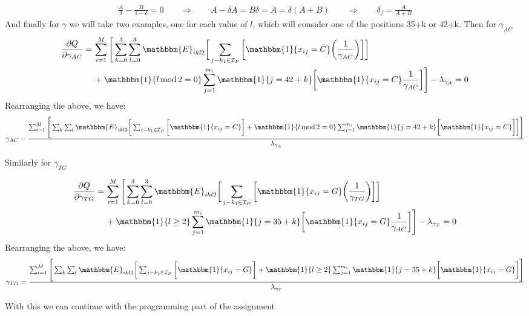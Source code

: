 \documentclass[10pt]{article}
\begin{document}
\begin{enumerate}[label = \textbf{\arabic*.}]
\begin{align}
            \frac{A}{\delta}-\frac{B}{1-\delta}=0 \qquad\Rightarrow \qquad A-\delta A=B\delta = A = \delta(A+B)\qquad \Rightarrow \qquad\delta_j=\frac{A}{A+B}
        \end{align}
        And finally for $\gamma$ we will take two examples, one for each value of $l$, which will consider one of the positions 35+k or 42+k. Then for $\gamma_{AC}$
        \begin{align}
            \frac{\partial Q}{\partial \gamma_{AC}} = \,&\sum_{i=1}^M\Bigg[\sum_{k=0}^3\sum_{l=0}^3\mathbbm{E}_{ikl2}\bigg[\sum_{j - k_1 \in \mathcal{I}_P}\bigg[\mathbbm{1}\{x_{ij}=C\}\bigg(\frac{1}{\gamma_{AC}} \bigg) \bigg] \bigg]\nonumber\nonumber\\
            &+ \mathbbm{1}\{l\,\mathrm{mod}\,2 = 0\}\sum_{j=1}^{m_i}\mathbbm{1}\{j=42+k\}\bigg[\mathbbm{1}\{x_{ij}=C\}\frac{1}{\gamma_{AC}} \bigg]\Bigg] - \lambda_{\gamma_A} = 0 \nonumber
        \end{align}
        Rearranging the above, we have:
        \begin{align}
            \gamma_{AC} = \frac{\sum_{i=1}^M\Bigg[\sum_k\sum_l\mathbbm{E}_{ikl2}\bigg[\sum_{j - k_1 \in \mathcal{I}_P}\bigg[\mathbbm{1}\{x_{ij}=C\}\bigg] + \mathbbm{1}\{l\,\mathrm{mod}\,2 = 0\}\sum_{j=1}^{m_i}\mathbbm{1}\{j=42+k\}\bigg[\mathbbm{1}\{x_{ij}=C\} \bigg]\bigg]\Bigg]}{\lambda_{\gamma_A}}
        \end{align}
       
       Similarly for $\gamma_{TG}$
        
        \begin{align}
            \frac{\partial Q}{\partial \gamma_{TG}} = \,&\sum_{i=1}^M\Bigg[\sum_{k=0}^3\sum_{l=0}^3\mathbbm{E}_{ikl2}\bigg[\sum_{j - k_1 \in \mathcal{I}_P}\bigg[\mathbbm{1}\{x_{ij}=G\}\bigg(\frac{1}{\gamma_{TG}} \bigg) \bigg] \bigg]\nonumber\nonumber\\
            &+ \mathbbm{1}\{l\geq2\}\sum_{j=1}^{m_i}\mathbbm{1}\{j=35+k\}\bigg[\mathbbm{1}\{x_{ij}=G\}\frac{1}{\gamma_{AC}} \bigg]\Bigg] - \lambda_{\gamma_T} = 0 \nonumber
        \end{align}
        Rearranging the above, we have:
        \begin{align}
            \gamma_{TG} = \frac{\sum_{i=1}^M\Bigg[\sum_k\sum_l\mathbbm{E}_{ikl2}\bigg[\sum_{j - k_1 \in \mathcal{I}_P}\bigg[\mathbbm{1}\{x_{ij}=G\}\bigg] + \mathbbm{1}\{l\geq2\}\sum_{j=1}^{m_i}\mathbbm{1}\{j=35+k\}\bigg[\mathbbm{1}\{x_{ij}=G\} \bigg]\Bigg]}{\lambda_{\gamma_T}} 
        \end{align}
        
        With this we can continue with the programming part of the assignment

    \end{enumerate}
\end{document}
